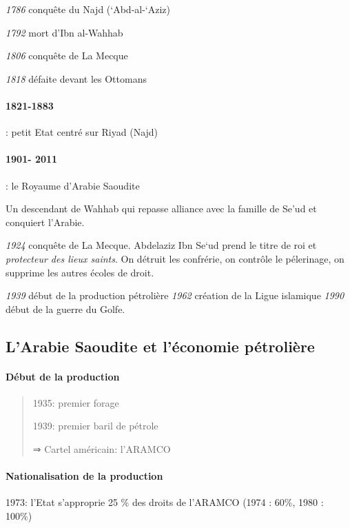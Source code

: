 \emph{1786} conquête du Najd (`Abd-al-`Aziz)
 
\emph{1792} mort d'Ibn al-Wahhab
 
\emph{1806} conquête de La Mecque
 
\emph{1818} défaite devant les Ottomans
 

 
  {\paragraph{1821-1883}: petit Etat centré sur Riyad (Najd)}
 
  {\paragraph{1901- 2011} : le Royaume d'Arabie Saoudite} Un descendant de Wahhab qui repasse alliance avec la famille de Se'ud et conquiert l'Arabie. 
 
 
\emph{1924} conquête de La Mecque. Abdelaziz Ibn Se`ud prend le titre de
roi et \textit{protecteur des lieux saints}. On détruit les confrérie, on contrôle le pélerinage, on supprime les autres écoles de droit.


\emph{1939} début de la production pétrolière \emph{1962} création de la
Ligue islamique \emph{1990} début de la guerre du Golfe.
 

 
\subsection{L'Arabie Saoudite et l'économie
pétrolière} 
 
\paragraph{ {Début de la
production}} 

\begin{quote}
1935: premier forage

1939: premier baril de pétrole

⇒ Cartel américain: l'ARAMCO
\end{quote}

 
\paragraph{{Nationalisation de la
production}}


1973: l'Etat s'approprie 25 \% des droits de l'ARAMCO (1974 : 60\%, 1980 : 100\%)



